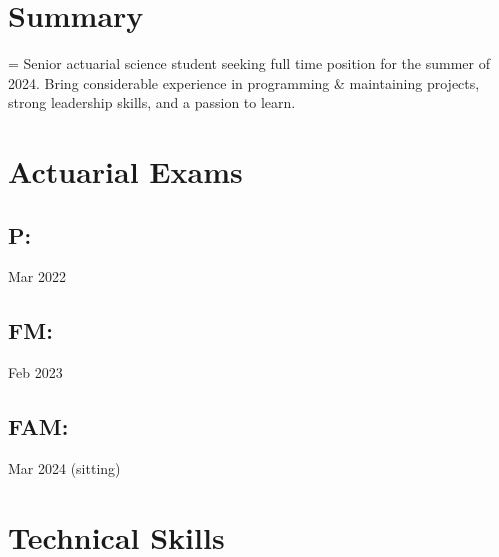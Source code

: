 \documentclass[12pt]{article}
\newcommand{\itemspace}{\vspace{0.1870em}}
\newcommand\textbox[1]
    {\parbox{.375\textwidth}{#1}} %
\begin{document}
\maketitle

\vspace{-2.8mm}
\noindent\hrulefill

\vspace{-4.5mm}
\noindent\hrulefill

\itemspace
\section{Summary}

\hangindent=\parindent %
Senior actuarial science student seeking full time position for the summer of
2024. Bring considerable experience in programming \& maintaining projects,
strong leadership skills, and a passion to learn.

\itemspace

\section{Actuarial Exams}


\textbox{\subsection{P:} {Mar 2022}\hfill}
\textbox{\hfil \subsection{FM:} {Feb 2023}}
\textbox{\hfill\subsection{FAM:} {Mar 2024 (sitting)}}

\itemspace

\section{Technical Skills}
\end{document}
